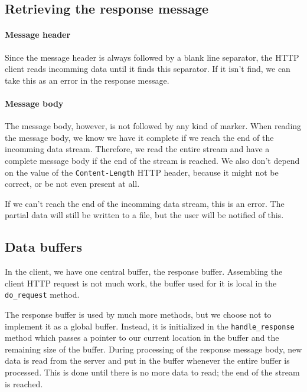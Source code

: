 \documentclass[11pt]{article}
\begin{document}
\subsection{Retrieving the response message}

\paragraph{Message header}

Since the message header is always followed by a blank line separator, the
HTTP client reads incomming data until it finds this separator. If it isn't
find, we can take this as an error in the response message.

\paragraph{Message body}

The message body, however, is not followed by any kind of marker. When reading
the message body, we know we have it complete if we reach the end of the
incomming data stream. Therefore, we read the entire stream and have a
complete message body if the end of the stream is reached. We also don't
depend on the value of the \lstinline|Content-Length| HTTP header, because it
might not be correct, or be not even present at all.

If we can't reach the end of the incomming data stream, this is an error. The
partial data will still be written to a file, but the user will be notified of
this.


\subsection{Data buffers}

In the client, we have one central buffer, the response buffer. Assembling the
client HTTP request is not much work, the buffer used for it is local in the
\lstinline|do_request| method.

The response buffer is used by much more methods, but we choose not to
implement it as a global buffer. Instead, it is initialized in the
\lstinline|handle_response| method which passes a pointer to our current
location in the buffer and the remaining size of the buffer. During processing
of the response message body, new data is read from the server and put in the
buffer whenever the entire buffer is processed. This is done until there is no
more data to read; the end of the stream is reached.
\end{document}

